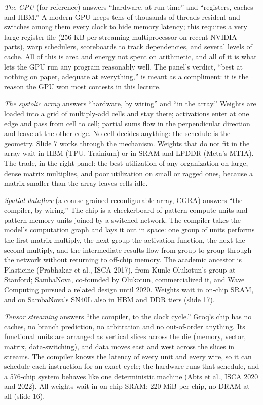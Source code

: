 \documentclass[11pt,letterpaper]{article}
\begin{document}
\emph{The GPU} (for reference) answers ``hardware, at run time'' and ``registers, caches and HBM.'' A modern GPU keeps tens of thousands of threads resident and switches among them every clock to hide memory latency; this requires a very large register file (256 KB per streaming multiprocessor on recent NVIDIA parts), warp schedulers, scoreboards to track dependencies, and several levels of cache. All of this is area and energy not spent on arithmetic, and all of it is what lets the GPU run any program reasonably well. The panel's verdict, ``best at nothing on paper, adequate at everything,'' is meant as a compliment: it is the reason the GPU won most contests in this lecture.

\emph{The systolic array} answers ``hardware, by wiring'' and ``in the array.'' Weights are loaded into a grid of multiply-add cells and stay there; activations enter at one edge and pass from cell to cell; partial sums flow in the perpendicular direction and leave at the other edge. No cell decides anything: the schedule is the geometry. Slide 7 works through the mechanism. Weights that do not fit in the array wait in HBM (TPU, Trainium) or in SRAM and LPDDR (Meta's MTIA). The trade, in the right panel: the best utilization of any organization on large, dense matrix multiplies, and poor utilization on small or ragged ones, because a matrix smaller than the array leaves cells idle.

\emph{Spatial dataflow} (a coarse-grained reconfigurable array, CGRA) answers ``the compiler, by wiring.'' The chip is a checkerboard of pattern compute units and pattern memory units joined by a switched network. The compiler takes the model's computation graph and lays it out in space: one group of units performs the first matrix multiply, the next group the activation function, the next the second multiply, and the intermediate results flow from group to group through the network without returning to off-chip memory. The academic ancestor is Plasticine (Prabhakar et al., ISCA 2017), from Kunle Olukotun's group at Stanford; SambaNova, co-founded by Olukotun, commercialized it, and Wave Computing pursued a related design until 2020. Weights wait in on-chip SRAM, and on SambaNova's SN40L also in HBM and DDR tiers (slide 17).

\emph{Tensor streaming} answers ``the compiler, to the clock cycle.'' Groq's chip has no caches, no branch prediction, no arbitration and no out-of-order anything. Its functional units are arranged as vertical slices across the die (memory, vector, matrix, data-switching), and data moves east and west across the slices in streams. The compiler knows the latency of every unit and every wire, so it can schedule each instruction for an exact cycle; the hardware runs that schedule, and a 576-chip system behaves like one deterministic machine (Abts et al., ISCA 2020 and 2022). All weights wait in on-chip SRAM: 220 MiB per chip, no DRAM at all (slide 16).
\end{document}
